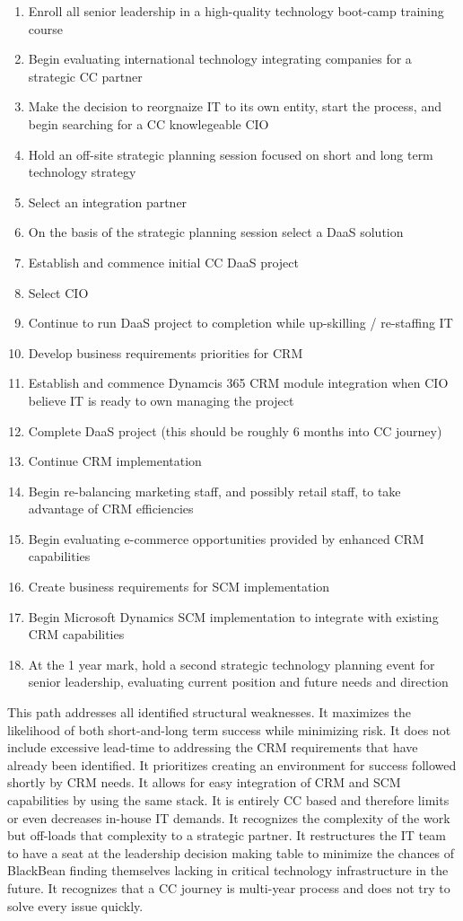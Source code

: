 \begin{enumerate}
  \item Enroll all senior leadership in a high-quality technology boot-camp training course
  \item Begin evaluating international technology integrating companies for a strategic CC partner
  \item Make the decision to reorgnaize IT to its own entity, start the process, and begin searching for a CC knowlegeable CIO
  \item Hold an off-site strategic planning session focused on short and long term technology strategy
  \item Select an integration partner
  \item On the basis of the strategic planning session select a DaaS solution
  \item Establish and commence initial CC DaaS project
  \item Select CIO
  \item Continue to run DaaS project to completion while up-skilling / re-staffing IT
  \item Develop business requirements priorities for CRM
  \item Establish and commence Dynamcis 365 CRM module integration when CIO believe IT is ready to own managing the project
  \item Complete DaaS project (this should be roughly 6 months into CC journey)
  \item Continue CRM implementation
  \item Begin re-balancing marketing staff, and possibly retail staff, to take advantage of CRM efficiencies
  \item Begin evaluating e-commerce opportunities provided by enhanced CRM capabilities
  \item Create business requirements for SCM implementation
  \item Begin Microsoft Dynamics SCM implementation to integrate with existing CRM capabilities
  \item At the 1 year mark, hold a second strategic technology planning event for senior leadership, evaluating current position and future needs and direction

\end{enumerate}

This path addresses all identified structural weaknesses. It maximizes the likelihood of both short-and-long term success while minimizing risk. It does not include excessive lead-time to addressing the CRM requirements that have already been identified. It prioritizes creating an environment for success followed shortly by CRM needs. It allows for easy integration of CRM and SCM capabilities by using the same stack. It is entirely CC based and therefore limits or even decreases in-house IT demands. It recognizes the complexity of the work but off-loads that complexity to a strategic partner. It restructures the IT team to have a seat at the leadership decision making table to minimize the chances of BlackBean finding themselves lacking in critical technology infrastructure in the future. It recognizes that a CC journey is multi-year process and does not try to solve every issue quickly.


